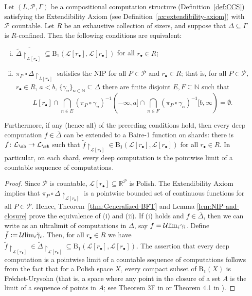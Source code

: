 \begin{theorem}\label{thm:nip-baire1def}
    Let $(L,\mathcal{P},\Gamma)$ be a compositional computation structure (Definition~\ref{def:CCS}) satisfying the Extendibility Axiom (see Definition~\ref{ax:extendibility-axiom}) with $\mathcal{P}$ countable.
    Let $R$ be an exhaustive collection of sizers, and suppose that $\Delta\subseteq\Gamma$ is $R$-confined.
    Then the following conditions are equivalent:

    \begin{enumerate}[(i)]
        \item $\overline{\tilde\Delta\restriction_{\mathcal{L}[r_\bullet]}}\subseteq \mathrm{B}_1(\mathcal{L}[r_\bullet],\mathcal{L}[r_\bullet])$ for all $r_\bullet\in R$;
        \item $\pi_P\circ \Delta\restriction_{L[r_\bullet]}$ satisfies the NIP for all $P\in\mathcal{P}$ and $r_\bullet\in R$; that is, for all $P\in\mathcal{P}$, $r_\bullet\in R$, $a<b$, $\{\gamma_n\}_{n\in\mathbb{N}}\subseteq\Delta$ there are finite disjoint $E,F\subseteq\mathbb{N}$ such that
        \[L[r_\bullet]\cap\bigcap_{n\in E}(\pi_P\circ\gamma_n)^{-1}(-\infty,a]\cap\bigcap_{n\in F}(\pi_P\circ\gamma_n)^{-1}[b,\infty)=\emptyset.\]
    \end{enumerate}

    Furthermore, if any (hence all) of the preceding conditions hold, then every deep computation $f\in\overline{\Delta}$ can be extended to a Baire-1 function on shards: there is $\tilde f\colon\mathcal{L}_{\sh}\to \mathcal{L}_{\sh}$ such that $\tilde f\restriction_{\mathcal{L}[r_\bullet]}\in \mathrm{B}_1(\mathcal{L}[r_\bullet],\mathcal{L}[r_\bullet])$ for all $r_{\bullet}\in R$.
    In particular, on each shard, every deep computation is the pointwise limit of a countable sequence of computations.
\end{theorem}

\begin{proof}
    Since $\mathcal{P}$ is countable, $\mathcal{L}[r_\bullet]\subseteq\mathbb{R}^\mathcal{P}$ is Polish.
    The Extendibility Axiom implies that $\pi_P\circ \tilde\Delta\restriction_{\mathcal{L}[r_\bullet]}$ is a pointwise bounded set of continuous functions for all $P\in\mathcal{P}$.
    Hence, Theorem~\ref{thm:Generalized-BFT} and Lemma \ref{lem:NIP-and-closure} prove the equivalence of (i) and (ii).
    If (i) holds and $f\in\overline{\Delta}$, then we can write as an ultralimit of computations in $\Delta$, say  $f=\mathcal{U}{\rm lim}_i \gamma_i$.
    Define $\tilde f:=\mathcal{U}{\rm lim}_i \tilde\gamma_i$.
    Then, for all $r_\bullet\in R$ we have $\tilde f\restriction_{\mathcal{L}[r_\bullet]}\in\overline{\tilde\Delta\restriction_{\mathcal{L}[r_\bullet]}}\subseteq \mathrm{B}_1(\mathcal{L}[r_\bullet],\mathcal{L}[r_\bullet])$.
    The assertion that every deep computation is a pointwise limit of a countable sequence of computations follows from the fact that for a Polish space $X$, every compact subset of $\mathrm{B}_1(X)$ is Fréchet-Urysohn (that is, a space where any point in the closure of a set $A$ is the limit of a sequence of points in $A$; see Theorem 3F in \cite{BFT_1978_PCompactBaire} or Theorem 4.1 in \cite{debs2013rosenthal}).
\end{proof}

